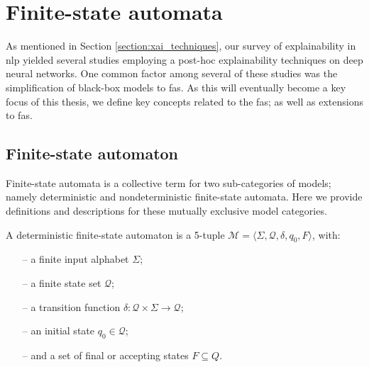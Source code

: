 \section{Finite-state automata}

\label{section:fa}

As mentioned in Section \ref{section:xai_techniques}, our survey of
explainability in \ac{nlp} yielded several studies employing a post-hoc
explainability techniques on deep neural networks. One common factor among
several of these studies was the simplification of black-box models to
\ac{fas}. As this will eventually become a key focus of this
thesis, we define key concepts related to the \ac{fas}; as well as extensions to \ac{fas}.

\subsection{Finite-state automaton}

Finite-state automata is a collective term for two sub-categories of models;
namely deterministic and nondeterministic finite-state automata. Here we provide
definitions and descriptions for these mutually exclusive model categories.

\begin{definition}
  \label{def:fa}
  A deterministic finite-state automaton is a 5-tuple $\mathcal{M} = \langle
  \Sigma, \mathcal{Q}, \delta, q_0, F \rangle$, with:
  \begin{itemize}
    \itemsep0em
    \item[--] a finite input alphabet $\Sigma$;
    \item[--] a finite state set $\mathcal{Q}$;
    \item[--] a transition function $\delta: \mathcal{Q} \times \Sigma
    \rightarrow \mathcal{Q}$;
    \item[--] an initial state $q_0 \in \mathcal{Q}$;
    \item[--] and a set of final or accepting states $F \subseteq Q$.
  \end{itemize}
\end{definition}

